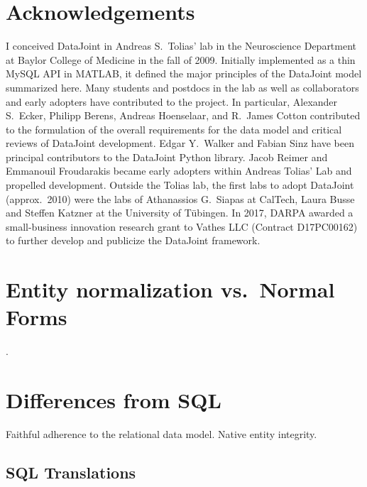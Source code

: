 \documentclass[letter,10pt]{article}
\begin{document}
\section{Acknowledgements}
I conceived DataJoint in Andreas S.\ Tolias' lab in the Neuroscience Department at Baylor College of Medicine in the fall of 2009. 
Initially implemented as a thin MySQL API in MATLAB, it defined the major principles of the DataJoint model summarized here. 
Many students and postdocs in the lab as well as collaborators and early adopters have contributed to the project.
In particular, Alexander S.\ Ecker, Philipp Berens, Andreas Hoenselaar, and R.\ James Cotton contributed to the formulation of the overall requirements for the data model and critical reviews of DataJoint development.
Edgar Y.\ Walker and Fabian Sinz have been principal contributors to the DataJoint Python library. 
Jacob Reimer and Emmanouil Froudarakis became early adopters within Andreas Tolias' Lab and propelled development.
Outside the Tolias lab, the first labs to adopt DataJoint (approx.\ 2010) were the labs of Athanassios G.\ Siapas at CalTech, Laura Busse and Steffen Katzner at the University of T\"ubingen.
In 2017, DARPA awarded a small-business innovation research grant to Vathes LLC (Contract D17PC00162) to further develop and publicize the DataJoint framework. 

\appendix
\section{Entity normalization vs.\ Normal Forms}.

\section{Differences from SQL}
Faithful adherence to the relational data model. 
Native entity integrity.

\subsection{SQL Translations}



\end{document}
